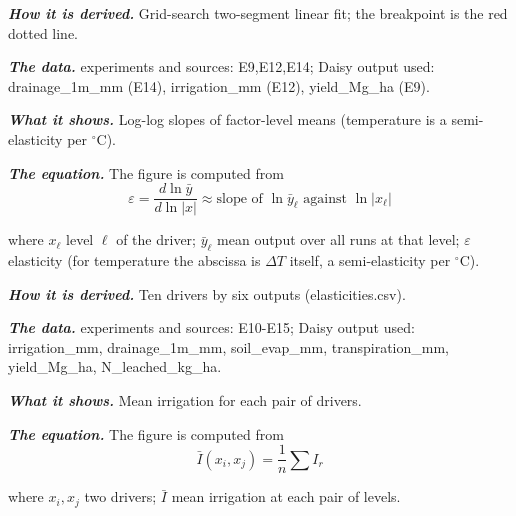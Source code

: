\par\noindent\textbf{\color{khmag}\emph{How it is derived.}} Grid-search two-segment linear fit; the breakpoint is the red dotted line.
\par\noindent\textbf{\color{khmag}\emph{The data.}} experiments and sources: E9,E12,E14; Daisy output used: drainage\_1m\_mm (E14), irrigation\_mm (E12), yield\_Mg\_ha (E9).
\par\vspace{6pt}\noindent{}\par\nobreak
{}\label{fig:a20_22}
\par\noindent\textbf{\color{khmag}\emph{What it shows.}} Log-log slopes of factor-level means (temperature is a semi-elasticity per $^\circ$C).
\par\noindent\textbf{\color{khmag}\emph{The equation.}} The figure is computed from
\begin{equation}\boxed{\varepsilon=\dfrac{d\ln \bar y}{d\ln |x|}\approx \text{slope of } \ln\bar y_\ell \text{ against } \ln|x_\ell|}\end{equation}
\par\noindent where $x_\ell$ level $\ell$ of the driver; $\bar y_\ell$ mean output over all runs at that level; $\varepsilon$ elasticity (for temperature the abscissa is $\Delta T$ itself, a semi-elasticity per $^\circ$C).
\par\noindent\textbf{\color{khmag}\emph{How it is derived.}} Ten drivers by six outputs (elasticities.csv).
\par\noindent\textbf{\color{khmag}\emph{The data.}} experiments and sources: E10-E15; Daisy output used: irrigation\_mm, drainage\_1m\_mm, soil\_evap\_mm, transpiration\_mm, yield\_Mg\_ha, N\_leached\_kg\_ha.
\par\vspace{6pt}\noindent{}\par\nobreak
{}\label{fig:a20_23}
\par\noindent\textbf{\color{khmag}\emph{What it shows.}} Mean irrigation for each pair of drivers.
\par\noindent\textbf{\color{khmag}\emph{The equation.}} The figure is computed from
\begin{equation}\boxed{\bar I(x_i,x_j)=\dfrac1n\sum I_r}\end{equation}
\par\noindent where $x_i,x_j$ two drivers; $\bar I$ mean irrigation at each pair of levels.
